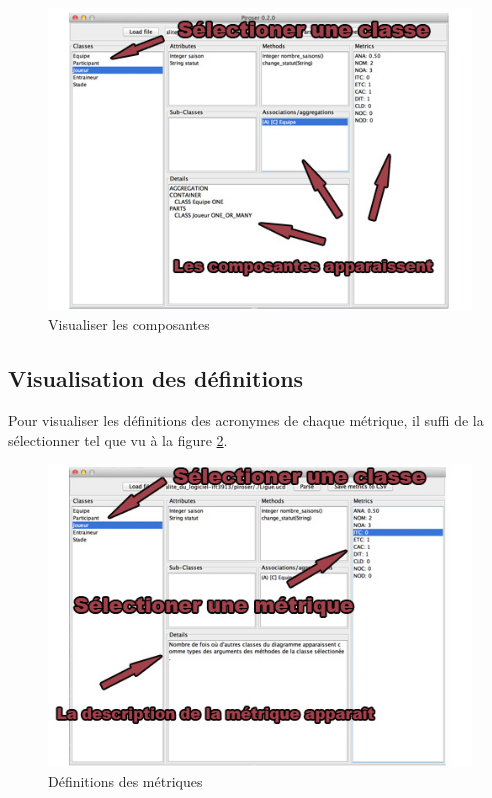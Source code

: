 \documentclass[12pt]{article}
\begin{document}
\begin{figure}
\includegraphics[width=\textwidth]{composantes.jpg}
\caption{\label{fig:view}Visualiser les composantes}
\end{figure}

\subsection{Visualisation des définitions}
Pour visualiser les définitions des acronymes de chaque métrique, il suffi de la sélectionner tel que vu à la figure \ref{fig:definitions}.

\begin{figure}
\includegraphics[width=\textwidth]{metrique.jpg}
\caption{\label{fig:definitions}Définitions des métriques}
\end{figure}
\end{document}
